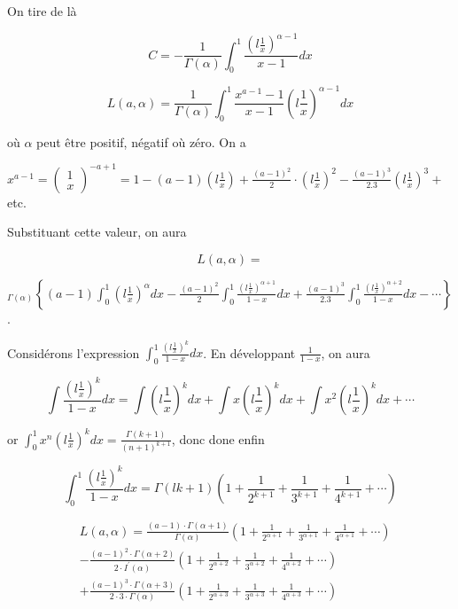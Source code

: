 \documentclass{article}
\begin{document}
On tire de là

\[
C=-\frac{1}{\Gamma(\alpha)} \int_{0}^{1} \frac{\left(l \frac{1}{x}\right)^{\alpha-1}}{x-1} d x
\]

\[
L(a, \alpha)=\frac{1}{\Gamma(\alpha)} \int_{0}^{1} \frac{x^{a-1}-1}{x-1}\left(l \frac{1}{x}\right)^{\alpha-1} d x
\]

où \(\alpha\) peut être positif, négatif où zéro. On a

\(x^{a-1}=\left(\begin{array}{c}1 \\ x\end{array}\right)^{-a+1}=1-(a-1)\left(l \frac{1}{x}\right)+\frac{(a-1)^{2}}{2} \cdot\left(l \frac{1}{x}\right)^{2}-\frac{(a-1)^{3}}{2.3}\left(l \frac{1}{x}\right)^{3}+\) etc.

Substituant cette valeur, on aura

\[
L(a, \alpha)=
\]

\({ }_{\Gamma(\alpha)}\left\{(a-1) \int_{0}^{1}\left(l \frac{1}{x}\right)^{\alpha} d x-\frac{(a-1)^{2}}{2} \int_{0}^{1} \frac{\left(l \frac{1}{x}\right)^{\alpha+1}}{1-x} d x+\frac{(a-1)^{3}}{2.3} \int_{0}^{1} \frac{\left(l \frac{1}{x}\right)^{\alpha+2}}{1-x} d x-\cdots\right\}\).

Considérons l'expression \(\int_{0}^{1} \frac{\left(l \frac{1}{x}\right)^{k}}{1-x} d x\). En développant \(\frac{1}{1-x}\), on aura

\[
\int \frac{\left(l \frac{1}{x}\right)^{k}}{1-x} d x=\int\left(l \frac{1}{x}\right)^{k} d x+\int x\left(l \frac{1}{x}\right)^{k} d x+\int x^{2}\left(l \frac{1}{x}\right)^{k} d x+\cdots
\]

or \(\int_{0}^{1} x^{n}\left(l \frac{1}{x}\right)^{k} d x=\frac{\Gamma(k+1)}{(n+1)^{k+1}}\), donc
done enfin

\[
\int_{0}^{1} \frac{\left(l \frac{1}{x}\right)^{k}}{1-x} d x=\Gamma(l k+1)\left(1+\frac{1}{2^{k+1}}+\frac{1}{3^{k+1}}+\frac{1}{4^{k+1}}+\cdots\right)
\]

\[
\begin{aligned}
& L(a, \alpha)=\frac{(a-1) \cdot \Gamma(\alpha+1)}{\Gamma(\alpha)}\left(1+\frac{1}{2^{\alpha+1}}+\frac{1}{3^{\alpha+1}}+\frac{1}{4^{\alpha+1}}+\cdots\right) \\
& -\frac{(a-1)^{2} \cdot \Gamma(\alpha+2)}{2 \cdot I^{\prime}(\alpha)}\left(1+\frac{1}{2^{\alpha+2}}+\frac{1}{3^{\alpha+2}}+\frac{1}{4^{\alpha+2}}+\cdots\right) \\
& +\frac{(a-1)^{3} \cdot \Gamma(\alpha+3)}{2 \cdot 3 \cdot \Gamma(\alpha)}\left(1+\frac{1}{2^{\alpha+3}}+\frac{1}{3^{\alpha+3}}+\frac{1}{4^{\alpha+3}}+\cdots\right)
\end{aligned}
\]
\end{document}
